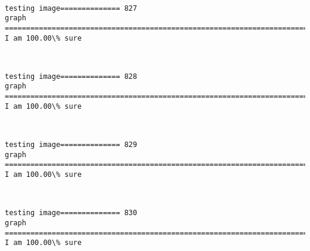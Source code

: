 \documentclass[11pt]{article}
\begin{document}
    \begin{center}
    \end{center}
    { \hspace*{\fill} \\}
    
    \begin{Verbatim}[commandchars=\\\{\}]
testing image============== 827
graph
============================================================================
I am 100.00\% sure

    \end{Verbatim}

    \begin{center}
    \end{center}
    { \hspace*{\fill} \\}
    
    \begin{Verbatim}[commandchars=\\\{\}]
testing image============== 828
graph
============================================================================
I am 100.00\% sure

    \end{Verbatim}

    \begin{center}
    \end{center}
    { \hspace*{\fill} \\}
    
    \begin{Verbatim}[commandchars=\\\{\}]
testing image============== 829
graph
============================================================================
I am 100.00\% sure

    \end{Verbatim}

    \begin{center}
    \end{center}
    { \hspace*{\fill} \\}
    
    \begin{Verbatim}[commandchars=\\\{\}]
testing image============== 830
graph
============================================================================
I am 100.00\% sure

    \end{Verbatim}
\end{document}
